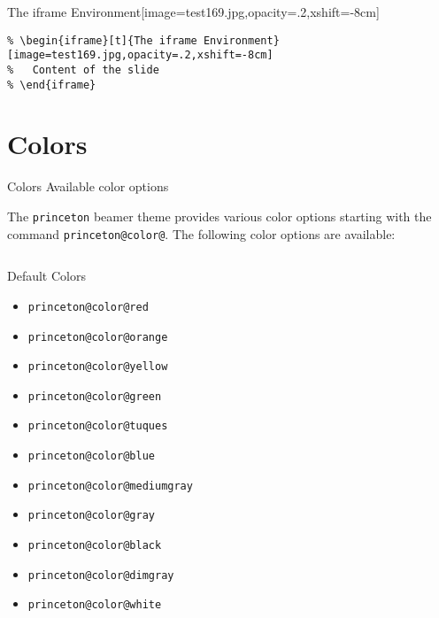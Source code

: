 \documentclass[aspectratio=169]{beamer}
\begin{document}
\begin{iframe}[t]{The iframe Environment}[image=test169.jpg,opacity=.2,xshift=-8cm]
  \begin{example}
    \begin{lstlisting}
% \begin{iframe}[t]{The iframe Environment}[image=test169.jpg,opacity=.2,xshift=-8cm]
%   Content of the slide
% \end{iframe}
    \end{lstlisting}
  \end{example}
\end{iframe}


\section{Colors}
\begin{frame}[t]{Colors }{Available color options}

  The \texttt{princeton} beamer theme provides various color options starting with the command \texttt{princeton@color@}. The following color options are available:

  \begin{columns}[T]
    \begin{column}{.33\textwidth}
      \begin{block}{Default Colors}
        \begin{itemize}
        \item \textcolor{princeton@color@red}{\texttt{princeton@color@red}}
        \item \textcolor{princeton@color@orange}{\texttt{princeton@color@orange}}
        \item \textcolor{princeton@color@yellow}{\texttt{princeton@color@yellow}}
        \item \textcolor{princeton@color@green}{\texttt{princeton@color@green}}
        \item \textcolor{princeton@color@tuques}{\texttt{princeton@color@tuques}}
        \item \textcolor{princeton@color@blue}{\texttt{princeton@color@blue}}
        \item \textcolor{princeton@color@mediumgray}{\texttt{princeton@color@mediumgray}}
        \item \textcolor{princeton@color@gray}{\texttt{princeton@color@gray}}
        \item \textcolor{princeton@color@black}{\texttt{princeton@color@black}}
        \item \textcolor{princeton@color@dimgray}{\texttt{princeton@color@dimgray}}
        \item \textcolor{princeton@color@white}{\texttt{princeton@color@white}}
        \end{itemize}
      \end{block}
    \end{column}


\end{columns}
\end{frame}
\end{document}
